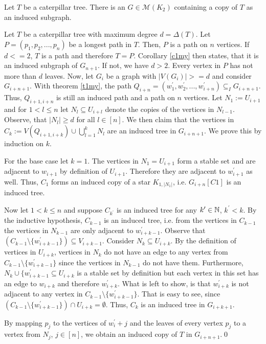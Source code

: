 \begin{thm}
Let $T$ be a caterpillar tree. There is an $G\in\mathcal{M}(K_2)$ containing a copy of $T$ as an induced subgraph.
\end{thm}
\begin{prf}
Let $T$ be a caterpillar tree with maximum degree $d = \Delta (T)$. Let $P=(p_1,p_2,...,p_n)$ be a longest path in $T$. Then, $P$ is a path on $n$ vertices. If $d<=2$, $T$ is a path and therefore $T=P$. Corollary \ref{c1my} then states, that it is an induced subgraph of $G_{n+1}$. 
If not, we have $d>2$. Every vertex in $P$ has not more than $d$ leaves. Now, let $G_i$ be a graph with $|V(G_i)| >= d$ and consider $G_{i+n+1}$. With theorem \ref{t1my}, the path $Q_{i+n}=(w^\prime_1,w^\prime_2,...,w^\prime_{i+n})\subseteq_I G_{i+n+1}$. Thus, $Q_{i+1,i+n}$ is still an induced path and a path on $n$ vertices. Let $N_1:=U_{i+1}$ and for $1<l\leq n$ let $N_l\subseteq U_{i+l}$ denote the copies of the vertices in $N_{l-1}$. Observe, that $\vert N_l \vert \geq d$ for all $l\in [n]$. We then claim that the vertices in $C_k:=V(Q_{i+1,i+k})\cup\bigcup_{l=1}^k N_l$ are an induced tree in $G_{i+n+1}$. We prove this by induction on $k$.

For the base case let $k=1$. The vertices in $N_1=U_{i+1}$ form a stable set  and are adjacent to $w_{i+1}$ by definition of $U_{i+1}$. Therefore they are adjacent to $w^\prime_{i+1}$ as well. Thus, $C_1$ forms an induced copy of a star $K_{1,\vert N_1\vert}$, i.e. $G_{i+n}[C1]$ is an induced tree.

Now let $1<k\leq n$ and suppose $C_{k^\prime}$ is an induced tree for any $k^\prime\in\mathbb{N}$, $k^\prime <k$. By the inductive hypothesis, $C_{k-1}$ is an induced tree, i.e. from the vertices in $C_{k-1}$ the vertices in $N_{k-1}$ are only adjacent to $w_{i+k-1}^\prime$. Observe that $(C_{k-1}\setminus \lbrace w_{i+k-1}^\prime\rbrace )\subseteq V_{i+k-1}$. Consider $N_k\subseteq U_{i+k}$. By the definition of vertices in $U_{i+k}$, vertices in $N_k$ do not have an edge to any vertex from $C_{k-1}\setminus \lbrace w_{i+k-1}^\prime\rbrace$ since the vertices in $N_{k-1}$ do not have them. Furthermore, $N_k\cup\lbrace w_{i+k-1}^\prime \subseteq U_{i+k}$ is a stable set by definition but each vertex in this set has an edge to $w_{i+k}$ and therefore $w_{i+k}^\prime$. What is left to show, is that $w_{i+k}^\prime$ is not adjacent to any vertex in $C_{k-1}\setminus \lbrace w_{i+k-1}^\prime\rbrace$. That is easy to see, since $(C_{k-1}\setminus \lbrace w_{i+k-1}^\prime\rbrace )\cap U_{i+k}=\emptyset$.
Thus, $C_k$ is an induced tree in $G_{i+k+1}$.

By mapping $p_j$ to the vertices of $w^\prime_i+j$ and the leaves of every vertex $p_j$ to a vertex from $N_j$, $j\in [n]$, we obtain an induced copy of $T$ in $G_{i+n+1}$.\qed
\end{prf}

